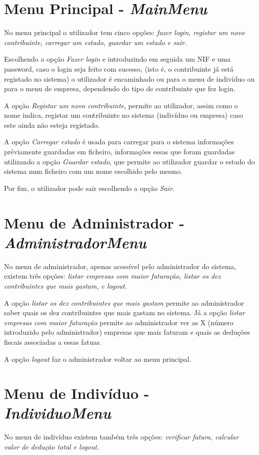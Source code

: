 \documentclass[12pt]{report}
\newcommand\tab[1][0.5cm]{\hspace*{#1}}
\begin{document}
\section{Menu Principal - \textit{MainMenu}}
\tab No menu principal o utilizador tem cinco opções: \textit{fazer login, registar um novo contribuinte, carregar um estado, guardar um estado e sair}.

Escolhendo a opção \textit{Fazer login} e introduzindo em seguida um NIF e uma password, caso o login seja feito com sucesso, (isto é, o contribuinte já está registado no sistema) o utilizador é encaminhado ou para o menu de indivíduo ou para o menu de empresa, dependendo do tipo de contribuinte que fez login.

A opção \textit{Registar um novo contribuinte}, permite ao utilizador, assim como o nome indica, registar um contribuinte no sistema (indivíduo ou empresa) caso este ainda não esteja registado.

A opção \textit{Carregar estado} é usada para carregar para o sistema informações préviamente guardadas em ficheiro, informações essas que foram guardadas utilizando a opção \textit{Guardar estado}, que permite ao utilizador guardar o estado do sistema num ficheiro com um nome escolhido pelo mesmo.

Por fim, o utilizador pode sair escolhendo a opção \textit{Sair}.

\section{Menu de Administrador - \textit{AdministradorMenu}}
\tab No menu de administrador, apenas acessível pelo administrador do sistema, existem três opções: \textit{listar empresas com maior faturação, listar os dez contribuintes que mais gastam, e logout}.

A opção \textit{listar os dez contribuintes que mais gastam} permite ao administrador saber quais os dez contribuintes que mais gastam no sistema. Já a opção \textit{listar empresas com maior faturação} permite ao administrador ver as X (número introduzido pelo administrador) empresas que mais faturam e quais as deduções fiscais associadas a essas fatuas.

A opção \textit{logout} faz o administrador voltar ao menu principal.

\section{Menu de Indivíduo - \textit{IndividuoMenu}}
\tab No menu de indivíduo existem também três opções: \textit{verificar fatura, calcular valor de dedução total e logout}.
\end{document}
